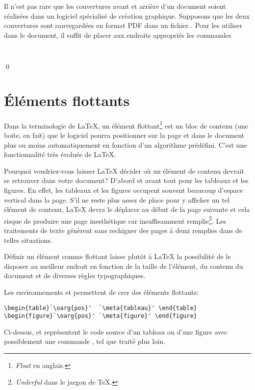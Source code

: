 \begin{exemple}
  Il n'est pas rare que les couvertures avant et arrière d'un document
  soient réalisées dans un logiciel spécialisé de création graphique.
  Supposons que les deux couvertures sont sauvegardées en format PDF
  dans un fichier . Pour les utiliser dans le
  document, il suffit de placer aux endroits appropriés les commandes
\begin{lstlisting}


\end{lstlisting}
  \qed
\end{exemple}


\section{Éléments flottants}
\label{sec:tableaux:floats}

Dans la terminologie de {\LaTeX}, un élément flottant\footnote{%
  \emph{Float} en anglais.} %
est un bloc de contenu (une boite, en fait) que le logiciel pourra
positionner sur la page et dans le document plus ou moins
automatiquement en fonction d'un algorithme prédéfini. C'est une
fonctionnalité très évoluée de {\LaTeX}.

Pourquoi voudriez-vous laisser {\LaTeX} décider où un élément de
contenu devrait se retrouver dans votre document? D'abord et avant
tout pour les tableaux et les figures. En effet, les tableaux et les
figures occupent souvent beaucoup d'espace vertical dans la page.
S'il ne reste plus assez de place pour y afficher un tel élément de
contenu, {\LaTeX} devra le déplacer au début de la page suivante et
cela risque de produire une page inesthétique car insuffisamment
remplie\footnote{%
  \emph{Underful } dans le jargon de {\TeX}.}. %
Les traitements de texte génèrent sans rechigner des pages à demi
remplies dans de telles situations.

Définir un élément comme flottant laisse plutôt à {\LaTeX} la
possibilité de le disposer au meilleur endroit en fonction
de la taille de l'élément, du contenu du document et de diverses
règles typographiques.

Les environnements  et  permettent de crer des
éléments flottants:
\begin{lstlisting}
\begin{table}`\oarg{pos}'  `\meta{tableau}' \end{table}
\begin{figure}`\oarg{pos}' `\meta{figure}' \end{figure}
\end{lstlisting}
Ci-dessus,  et  représentent le code source
d'un tableau ou d'une figure avec possiblement une commande
, tel que traité plus loin.

